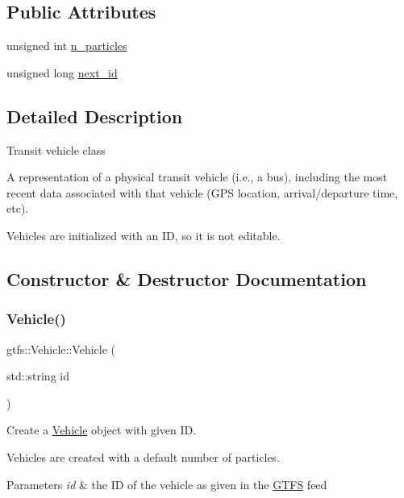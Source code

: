 \subsection*{Public Attributes}
\begin{DoxyCompactItemize}
\item 
unsigned int \hyperlink{classgtfs_1_1Vehicle_aa21babc8423abf92bbdf5e0748444f44}{n\+\_\+particles}
\item 
unsigned long \hyperlink{classgtfs_1_1Vehicle_aab535dd9953f9650e2adc351965779b1}{next\+\_\+id}
\end{DoxyCompactItemize}


\subsection{Detailed Description}
Transit vehicle class

A representation of a physical transit vehicle (i.\+e., a bus), including the most recent data associated with that vehicle (G\+PS location, arrival/departure time, etc).

Vehicles are initialized with an ID, so it is not editable. 

\subsection{Constructor \& Destructor Documentation}
\mbox{\label{classgtfs_1_1Vehicle_ac3f8111a611378f5f8b29f7465e48919}} 
\subsubsection{\texorpdfstring{Vehicle()}{Vehicle()}\hspace{0.1cm}{\footnotesize\ttfamily [1/2]}}
{\footnotesize\ttfamily gtfs\+::\+Vehicle\+::\+Vehicle (\begin{DoxyParamCaption}\item[{std\+::string}]{id }\end{DoxyParamCaption})}

Create a \hyperlink{classgtfs_1_1Vehicle}{Vehicle} object with given ID.

Vehicles are created with a default number of particles.


\begin{DoxyParams}{Parameters}
{\em id} & the ID of the vehicle as given in the \hyperlink{classgtfs_1_1GTFS}{G\+T\+FS} feed \\
\hline
\end{DoxyParams}
\mbox{\label{classgtfs_1_1Vehicle_adf892e71483b7f9005846599fd0308e6}} 
